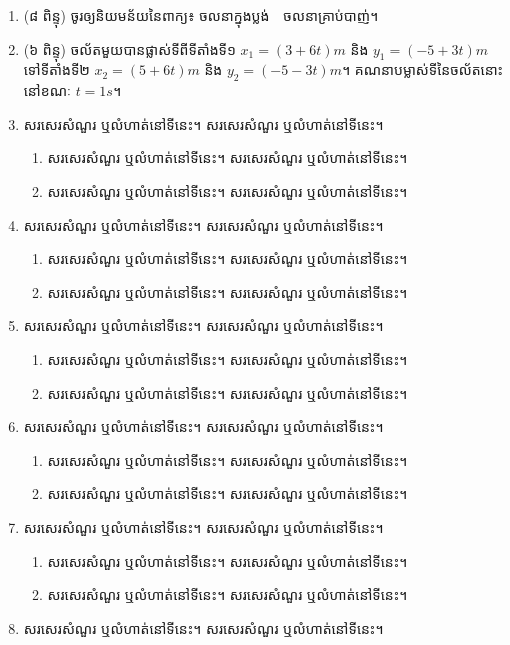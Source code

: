 \documentclass[12pt,a4paper]{pptexam}
\begin{document}
\topic[ប្រធាន]
\begin{enumerate}
	\item(៨ ពិន្ទុ) ចូរឲ្យនិយមន័យនៃពាក្យ៖ ចលនាក្នុងប្លង់~~ចលនាគ្រាប់បាញ់។
	\item (៦ ពិន្ទុ) ចល័តមួយបានផ្លាស់ទីពីទីតាំងទី១ $x_1=\left(3+6t\right)m$ និង $y_1=\left(-5+3t\right)m$\\
	ទៅទីតាំងទី២ $x_2=\left(5+6t\right)m$ និង $y_2=\left(-5-3t\right)m$។
		គណនាបម្លាស់ទីនៃចល័តនោះនៅខណៈ $t=1s$។
	\item សរសេរសំណួរ ឬលំហាត់នៅទីនេះ។ សរសេរសំណួរ ឬលំហាត់នៅទីនេះ។ 
	\begin{enumerate}
		\item សរសេរសំណួរ ឬលំហាត់នៅទីនេះ។ សរសេរសំណួរ ឬលំហាត់នៅទីនេះ។ 
		\item សរសេរសំណួរ ឬលំហាត់នៅទីនេះ។ សរសេរសំណួរ ឬលំហាត់នៅទីនេះ។ 
	\end{enumerate}
	\item សរសេរសំណួរ ឬលំហាត់នៅទីនេះ។ សរសេរសំណួរ ឬលំហាត់នៅទីនេះ។ 
	\begin{enumerate}
		\item សរសេរសំណួរ ឬលំហាត់នៅទីនេះ។ សរសេរសំណួរ ឬលំហាត់នៅទីនេះ។ 
		\item សរសេរសំណួរ ឬលំហាត់នៅទីនេះ។ សរសេរសំណួរ ឬលំហាត់នៅទីនេះ។ 
	\end{enumerate}
	\item សរសេរសំណួរ ឬលំហាត់នៅទីនេះ។ សរសេរសំណួរ ឬលំហាត់នៅទីនេះ។ 
	\begin{enumerate}
		\item សរសេរសំណួរ ឬលំហាត់នៅទីនេះ។ សរសេរសំណួរ ឬលំហាត់នៅទីនេះ។ 
		\item សរសេរសំណួរ ឬលំហាត់នៅទីនេះ។ សរសេរសំណួរ ឬលំហាត់នៅទីនេះ។ 
	\end{enumerate}
	\item សរសេរសំណួរ ឬលំហាត់នៅទីនេះ។ សរសេរសំណួរ ឬលំហាត់នៅទីនេះ។ 
	\begin{enumerate}
		\item សរសេរសំណួរ ឬលំហាត់នៅទីនេះ។ សរសេរសំណួរ ឬលំហាត់នៅទីនេះ។ 
		\item សរសេរសំណួរ ឬលំហាត់នៅទីនេះ។ សរសេរសំណួរ ឬលំហាត់នៅទីនេះ។ 
	\end{enumerate}
	\item សរសេរសំណួរ ឬលំហាត់នៅទីនេះ។ សរសេរសំណួរ ឬលំហាត់នៅទីនេះ។ 
	\begin{enumerate}
		\item សរសេរសំណួរ ឬលំហាត់នៅទីនេះ។ សរសេរសំណួរ ឬលំហាត់នៅទីនេះ។ 
		\item សរសេរសំណួរ ឬលំហាត់នៅទីនេះ។ សរសេរសំណួរ ឬលំហាត់នៅទីនេះ។ 
	\end{enumerate}
	\item សរសេរសំណួរ ឬលំហាត់នៅទីនេះ។ សរសេរសំណួរ ឬលំហាត់នៅទីនេះ។ 

\end{enumerate}
\end{document}
